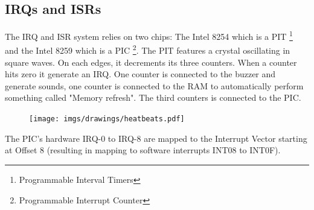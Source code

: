 \subsection{IRQs and ISRs}
The IRQ and ISR system relies on two chips: The Intel 8254 which is a PIT \footnote{Programmable Interval Timers} and the Intel 8259 which is a PIC \footnote{Programmable Interrupt Counter}. The PIT features a crystal oscillating in square waves. On each edges, it decrements its three counters. When a counter hits zero it generate an IRQ. One counter is connected to the buzzer and generate sounds, one counter is connected to the RAM to automatically perform something called "Memory refresh".  The third counters is connected to the PIC.\\
\par
\begin{figure}[H]
\centering
 \texttt{[image: imgs/drawings/heatbeats.pdf]}
 \end{figure}
\par

The PIC's hardware IRQ-0 to IRQ-8 are mapped to the Interrupt Vector starting at Offset 8 (resulting in mapping to software interrupts INT08 to INT0F).\\

